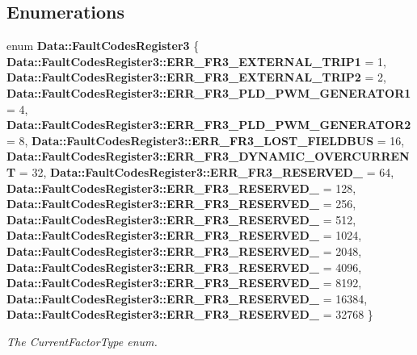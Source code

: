 \subsection*{Enumerations}
\begin{DoxyCompactItemize}
\item 
enum \textbf{ Data\+::\+Fault\+Codes\+Register3} \{ \newline
\textbf{ Data\+::\+Fault\+Codes\+Register3\+::\+E\+R\+R\+\_\+\+F\+R3\+\_\+\+E\+X\+T\+E\+R\+N\+A\+L\+\_\+\+T\+R\+I\+P1} = 1, 
\textbf{ Data\+::\+Fault\+Codes\+Register3\+::\+E\+R\+R\+\_\+\+F\+R3\+\_\+\+E\+X\+T\+E\+R\+N\+A\+L\+\_\+\+T\+R\+I\+P2} = 2, 
\textbf{ Data\+::\+Fault\+Codes\+Register3\+::\+E\+R\+R\+\_\+\+F\+R3\+\_\+\+P\+L\+D\+\_\+\+P\+W\+M\+\_\+\+G\+E\+N\+E\+R\+A\+T\+O\+R1} = 4, 
\textbf{ Data\+::\+Fault\+Codes\+Register3\+::\+E\+R\+R\+\_\+\+F\+R3\+\_\+\+P\+L\+D\+\_\+\+P\+W\+M\+\_\+\+G\+E\+N\+E\+R\+A\+T\+O\+R2} = 8, 
\newline
\textbf{ Data\+::\+Fault\+Codes\+Register3\+::\+E\+R\+R\+\_\+\+F\+R3\+\_\+\+L\+O\+S\+T\+\_\+\+F\+I\+E\+L\+D\+B\+US} = 16, 
\textbf{ Data\+::\+Fault\+Codes\+Register3\+::\+E\+R\+R\+\_\+\+F\+R3\+\_\+\+D\+Y\+N\+A\+M\+I\+C\+\_\+\+O\+V\+E\+R\+C\+U\+R\+R\+E\+NT} = 32, 
\textbf{ Data\+::\+Fault\+Codes\+Register3\+::\+E\+R\+R\+\_\+\+F\+R3\+\_\+\+R\+E\+S\+E\+R\+V\+E\+D\+\_} = 64, 
\textbf{ Data\+::\+Fault\+Codes\+Register3\+::\+E\+R\+R\+\_\+\+F\+R3\+\_\+\+R\+E\+S\+E\+R\+V\+E\+D\+\_} = 128, 
\newline
\textbf{ Data\+::\+Fault\+Codes\+Register3\+::\+E\+R\+R\+\_\+\+F\+R3\+\_\+\+R\+E\+S\+E\+R\+V\+E\+D\+\_} = 256, 
\textbf{ Data\+::\+Fault\+Codes\+Register3\+::\+E\+R\+R\+\_\+\+F\+R3\+\_\+\+R\+E\+S\+E\+R\+V\+E\+D\+\_} = 512, 
\textbf{ Data\+::\+Fault\+Codes\+Register3\+::\+E\+R\+R\+\_\+\+F\+R3\+\_\+\+R\+E\+S\+E\+R\+V\+E\+D\+\_} = 1024, 
\textbf{ Data\+::\+Fault\+Codes\+Register3\+::\+E\+R\+R\+\_\+\+F\+R3\+\_\+\+R\+E\+S\+E\+R\+V\+E\+D\+\_} = 2048, 
\newline
\textbf{ Data\+::\+Fault\+Codes\+Register3\+::\+E\+R\+R\+\_\+\+F\+R3\+\_\+\+R\+E\+S\+E\+R\+V\+E\+D\+\_} = 4096, 
\textbf{ Data\+::\+Fault\+Codes\+Register3\+::\+E\+R\+R\+\_\+\+F\+R3\+\_\+\+R\+E\+S\+E\+R\+V\+E\+D\+\_} = 8192, 
\textbf{ Data\+::\+Fault\+Codes\+Register3\+::\+E\+R\+R\+\_\+\+F\+R3\+\_\+\+R\+E\+S\+E\+R\+V\+E\+D\+\_} = 16384, 
\textbf{ Data\+::\+Fault\+Codes\+Register3\+::\+E\+R\+R\+\_\+\+F\+R3\+\_\+\+R\+E\+S\+E\+R\+V\+E\+D\+\_} = 32768
 \}\begin{DoxyCompactList}\small\item\em The Current\+Factor\+Type enum. \end{DoxyCompactList}
\end{DoxyCompactItemize}
